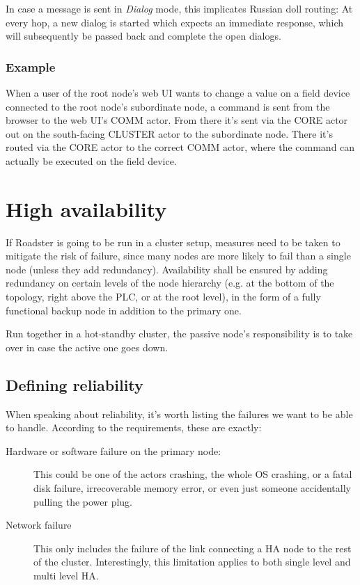 In case a message is sent in \emph{Dialog} mode, this implicates Russian doll routing: At every hop, a new dialog is started which expects an immediate response, which will subsequently be passed back and complete the open dialogs.

\subsubsection{Example}
When a user of the root node's web UI wants to change a value on a field device
connected to the root node's subordinate node, a command is sent from the
browser to the web UI's COMM actor. From there it's sent via the CORE actor out
on the south-facing CLUSTER actor to the subordinate node. There it's routed
via the CORE actor to the correct COMM actor, where the command can actually be
executed on the field device.

\section{High availability}\label{sec:approach:ha}
If Roadster is going to be run in a cluster setup, measures need to be taken to
mitigate the risk of failure, since many nodes are more likely to fail than a
single node (unless they add redundancy). Availability shall be ensured by
adding redundancy on certain levels of the node hierarchy (e.g. at the bottom
of the topology, right above the PLC, or at the root level), in the form of a
fully functional backup node in addition to the primary one.

Run together in a hot-standby cluster, the passive node's responsibility is to
take over in case the active one goes down.

\subsection{Defining reliability}
When speaking about reliability, it's worth listing the failures we want to be
able to handle. According to the requirements, these are exactly:

\begin{description}
	\item [Hardware or software failure on the primary node:]
		This could be one of the actors crashing, the whole OS
		crashing, or a fatal disk failure, irrecoverable memory error,
		or even just someone accidentally pulling the power plug.

	\item [Network failure]
		This only includes the failure of the link connecting a HA node
		to the rest of the cluster.  Interestingly, this limitation applies to both
		single level and multi level HA.
\end{description}

